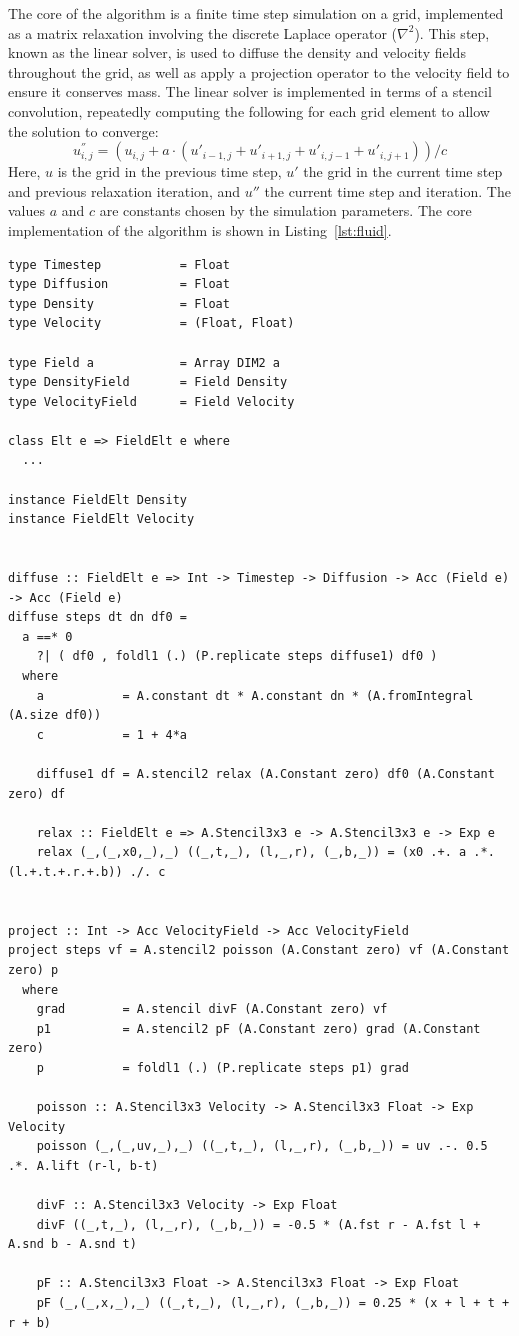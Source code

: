 The core of the algorithm is a finite time step simulation on a grid,
implemented as a matrix relaxation involving the discrete Laplace operator
($\nabla^2$). This step, known as the linear solver, is used to diffuse the
density and velocity fields throughout the grid, as well as apply a projection
operator to the velocity field to ensure it conserves mass. The linear solver is
implemented in terms of a stencil convolution, repeatedly computing the
following for each grid element to allow the solution to converge:
\[
u_{i,j}^{''} = \left( u_{i,j} + a \cdot \left( u'_{i-1,j}+u'_{i+1,j}+u'_{i,j-1}+u'_{i,j+1} \right) \right) / c
\]
Here, $u$ is the grid in the previous time step, $u'$ the grid in the current
time step and previous relaxation iteration, and $u''$ the current time step and
iteration. The values $a$ and $c$ are constants chosen by the simulation
parameters. The core implementation of the algorithm is shown in
Listing~\ref{lst:fluid}.

\begin{lstlisting}[style=haskell_float
    ,label=lst:fluid
    ,caption={Fluid flow simulation}]
type Timestep           = Float
type Diffusion          = Float
type Density            = Float
type Velocity           = (Float, Float)

type Field a            = Array DIM2 a
type DensityField       = Field Density
type VelocityField      = Field Velocity

class Elt e => FieldElt e where
  ...

instance FieldElt Density
instance FieldElt Velocity


diffuse :: FieldElt e => Int -> Timestep -> Diffusion -> Acc (Field e) -> Acc (Field e)
diffuse steps dt dn df0 =
  a ==* 0
    ?| ( df0 , foldl1 (.) (P.replicate steps diffuse1) df0 )
  where
    a           = A.constant dt * A.constant dn * (A.fromIntegral (A.size df0))
    c           = 1 + 4*a

    diffuse1 df = A.stencil2 relax (A.Constant zero) df0 (A.Constant zero) df

    relax :: FieldElt e => A.Stencil3x3 e -> A.Stencil3x3 e -> Exp e
    relax (_,(_,x0,_),_) ((_,t,_), (l,_,r), (_,b,_)) = (x0 .+. a .*. (l.+.t.+.r.+.b)) ./. c


project :: Int -> Acc VelocityField -> Acc VelocityField
project steps vf = A.stencil2 poisson (A.Constant zero) vf (A.Constant zero) p
  where
    grad        = A.stencil divF (A.Constant zero) vf
    p1          = A.stencil2 pF (A.Constant zero) grad (A.Constant zero)
    p           = foldl1 (.) (P.replicate steps p1) grad

    poisson :: A.Stencil3x3 Velocity -> A.Stencil3x3 Float -> Exp Velocity
    poisson (_,(_,uv,_),_) ((_,t,_), (l,_,r), (_,b,_)) = uv .-. 0.5 .*. A.lift (r-l, b-t)

    divF :: A.Stencil3x3 Velocity -> Exp Float
    divF ((_,t,_), (l,_,r), (_,b,_)) = -0.5 * (A.fst r - A.fst l + A.snd b - A.snd t)

    pF :: A.Stencil3x3 Float -> A.Stencil3x3 Float -> Exp Float
    pF (_,(_,x,_),_) ((_,t,_), (l,_,r), (_,b,_)) = 0.25 * (x + l + t + r + b)
\end{lstlisting}



